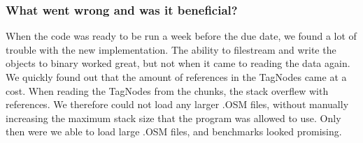 \subsubsection{What went wrong and was it beneficial?}
When the code was ready to be run a week before the due date, we found a lot of trouble with the new implementation. The ability to filestream and write the objects to binary worked great, but not when it came to reading the data again. We quickly found out that the amount of references in the TagNodes came at a cost. When reading the TagNodes from the chunks, the stack overflew with references. We therefore could not load any larger .OSM files, without manually increasing the maximum stack size that the program was allowed to use. Only then were we able to load large .OSM files, and benchmarks looked promising.

